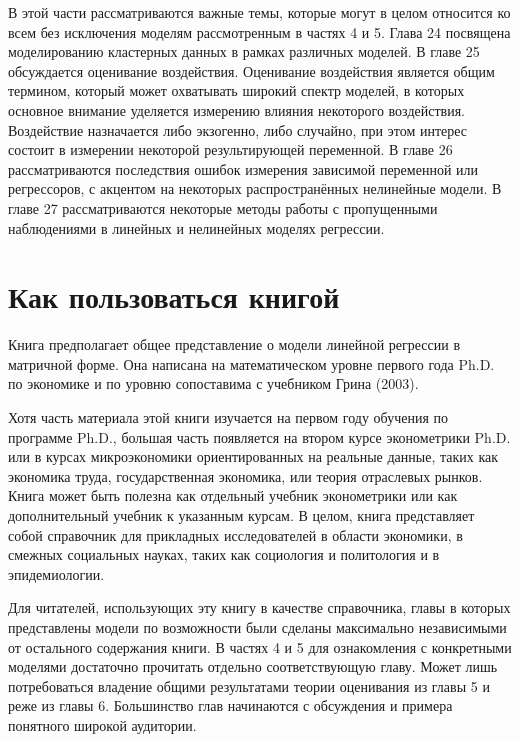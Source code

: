 В этой части рассматриваются важные темы, которые могут в целом относится ко всем без исключения моделям рассмотренным в частях 4 и 5. Глава 24 посвящена моделированию кластерных данных в рамках различных моделей. 
В главе 25 обсуждается оценивание воздействия. Оценивание воздействия является общим термином, который может охватывать широкий спектр моделей, в которых основное внимание уделяется измерению влияния некоторого воздействия. Воздействие назначается либо экзогенно, либо случайно, при этом интерес состоит в измерении некоторой результирующей переменной. В главе 26 рассматриваются последствия ошибок измерения зависимой переменной или  регрессоров, с акцентом на некоторых распространённых нелинейные модели. В главе 27 рассматриваются некоторые методы работы с пропущенными наблюдениями в линейных и нелинейных моделях регрессии.

\section{Как пользоваться книгой}

Книга предполагает общее представление о модели линейной регрессии в матричной форме. Она написана на математическом уровне первого года Ph.D. по экономике и по уровню сопоставима с учебником Грина (2003).


Хотя часть материала этой книги изучается на первом году обучения по программе Ph.D., большая часть  появляется на втором курсе эконометрики Ph.D. или в курсах микроэкономики ориентированных на реальные данные, таких как экономика труда, государственная экономика, или теория отраслевых рынков. Книга может быть полезна как отдельный учебник эконометрики или как дополнительный учебник к указанным курсам. В целом, книга представляет собой справочник для прикладных исследователей в области экономики, в смежных социальных науках, таких как социология и политология и в эпидемиологии.
	
	
Для читателей, использующих эту книгу в качестве справочника, главы в которых представлены модели по возможности были сделаны максимально независимыми от остального содержания книги. В частях 4 и 5 для ознакомления с конкретными моделями  достаточно прочитать отдельно соответствующую главу. Может лишь потребоваться владение общими результатами теории оценивания из главы 5 и реже из главы 6. Большинство глав начинаются с обсуждения и примера понятного широкой аудитории.
	
